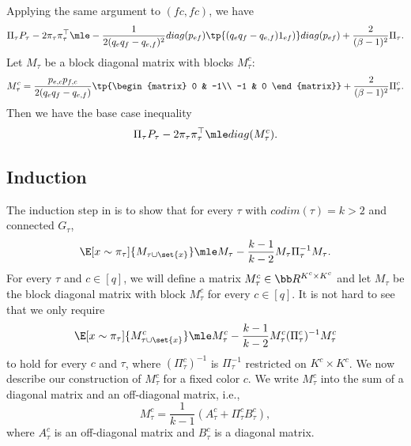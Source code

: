 \documentclass[a4paper,11pt]{article}
\begin{document}
Applying the same argument to $(fc, fc)$, we have
\begin{align*}
    \Pi_\tau P_\tau- 2\pi_\tau\pi_\tau^\top 
    \mle
    -\frac{1}{2(q_eq_f-q_{e,f})^2}\-{diag}(\*p_{ef})\tp{(q_eq_f-q_{e,f})\*1_{ef})} \-{diag}(\*p_{ef})
    +
    \frac{2}{(\beta-1)^2}\Pi_\tau.
\end{align*}
Let $M_\tau$ be a block diagonal matrix with blocks $M_\tau^c$:
\begin{equation}\label{eqn:base-case-def-ol}
    M_\tau^c=\frac{p_{e,c}p_{f,c}}{2(q_e q_f-q_{e,f})}\tp{\begin{matrix}
    0 & -1\\
    -1 & 0
\end{matrix}}
+
\frac{2}{(\beta-1)^2}\Pi^c_\tau.
\end{equation}
Then we have the base case inequality
\begin{align*}
    \Pi_\tau P_\tau- 2\pi_\tau\pi_\tau^\top \mle \-{diag}(M_\tau^c).
\end{align*}

\subsection{Induction}
The induction step in  is to show that for every $\tau$ with $\!{codim}(\tau) = k>2$ and connected $G_\tau$,
\begin{equation}\label{eqn:induction-main}
	\E[x\sim\pi_\tau]{M_{\tau\cup \set{x}}}\mle M_\tau - \frac{k-1}{k-2}M_\tau \Pi_\tau^{-1} M_\tau.
\end{equation}
For every $\tau$ and $c\in [q]$, we will define a matrix $M_\tau^c \in \bb R^{K^c\times K^c}$ and let $M_\tau$ be the block diagonal matrix with block $M_\tau^c$ for every $c\in [q]$. 
It is not hard to see that we only require 
\begin{equation}\label{eqn:induction-main-c}
	\E[x\sim\pi_\tau]{M_{\tau\cup \set{x}}^c}\mle M_\tau^c - \frac{k-1}{k-2}M_\tau^c (\Pi_\tau^c)^{-1} M_\tau^c
\end{equation}
to hold for every $c$ and $\tau$, where $(\Pi_\tau^c)^{-1}$ is $\Pi_\tau^{-1}$ restricted on $K^c\times K^c$.
We now describe our construction of $M^c_\tau$ for a fixed color $c$.
We write $M_\tau^c$ into the sum of a diagonal matrix and an off-diagonal matrix, i.e.,
\begin{equation}\label{eqn:N-decompose}
	M_\tau^c = \frac{1}{k-1}(A_\tau^c+\Pi_\tau^c B_\tau^c),
\end{equation}
where $A_\tau^c$ is an off-diagonal matrix and $B_\tau^c$ is a diagonal matrix.
\end{document}
